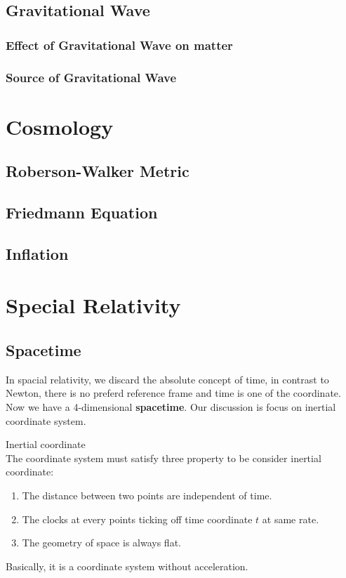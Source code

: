 \documentclass[12pt]{article}
\theoremstyle{mystyle}{\newtheorem{definition}{Definition}[section]}
\theoremstyle{mystyle}{\newtheorem{theorem}[definition]{Theorem}}
\theoremstyle{mystyle}{\newtheorem*{remark}{Remark}}
\theoremstyle{mystyle}{\newtheorem*{example}{Example}}
\theoremstyle{mystyle}{\newtheorem*{examples}{Examples}}
\theoremstyle{cstyle}{\newtheorem*{cthm}{}}
\begin{document}
\subsection{Gravitational Wave}
\subsubsection{Effect of Gravitational Wave on matter}
\subsubsection{Source of Gravitational Wave}

\section{Cosmology}
\subsection{Roberson-Walker Metric}
\subsection{Friedmann Equation}
\subsection{Inflation}

\newpage
\appendix



\section{Special Relativity}

\subsection{Spacetime}
In spacial relativity, we discard the absolute concept of time, in contrast to Newton, there is no preferd reference frame
and time is one of the coordinate.
Now we have a 4-dimensional \textbf{spacetime}. Our discussion is focus on inertial coordinate system.
\begin{definition}
  Inertial coordinate \\
  The coordinate system must satisfy three property to be consider inertial coordinate:
  \begin{enumerate}
    \item The distance between two points are independent of time.
    \item The clocks at every points ticking off time coordinate $t$ at same rate.
    \item The geometry of space is always flat.
  \end{enumerate}
  Basically, it is a coordinate system without acceleration.
\end{definition}
\end{document}
